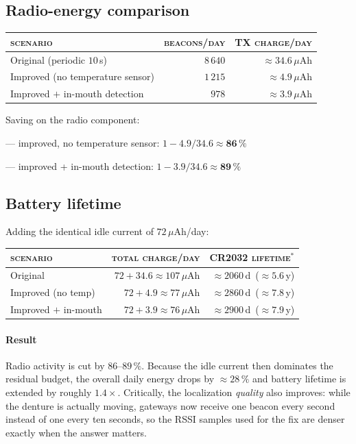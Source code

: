 \documentclass[11pt,a4paper]{article}
\begin{document}
\subsection*{Radio-energy comparison}

\begin{tabularx}{\linewidth}{@{} Y r r @{}}
\toprule
\textsc{scenario}                       & \textsc{beacons/day} & \textsc{TX charge/day} \\
\midrule
Original (periodic $10\,$s)             & $8\,640$ & $\approx 34.6\,\mu$Ah \\
Improved (no temperature sensor)        & $1\,215$ & $\approx 4.9\,\mu$Ah  \\
Improved $+$ in-mouth detection         & $978$    & $\approx 3.9\,\mu$Ah  \\
\bottomrule
\end{tabularx}

\smallskip
\noindent
Saving on the radio component:\par
\hspace*{1em}--- improved, no temperature sensor:\quad
$1 - 4.9/34.6 \approx \mathbf{86\,\%}$\par
\hspace*{1em}--- improved + in-mouth detection:\quad
$1 - 3.9/34.6 \approx \mathbf{89\,\%}$

\subsection*{Battery lifetime}

Adding the identical idle current of $72\,\mu$Ah/day:

\begin{tabularx}{\linewidth}{@{} Y r r @{}}
\toprule
\textsc{scenario}                       & \textsc{total charge/day} & \textsc{CR2032 lifetime}$^*$ \\
\midrule
Original                                & $72 + 34.6 \approx 107\,\mu$Ah  & $\approx 2060\,$d \,($\approx 5.6\,$y) \\
Improved (no temp)                      & $72 + 4.9 \approx 77\,\mu$Ah    & $\approx 2860\,$d \,($\approx 7.8\,$y) \\
Improved $+$ in-mouth                   & $72 + 3.9 \approx 76\,\mu$Ah    & $\approx 2900\,$d \,($\approx 7.9\,$y) \\
\bottomrule
\end{tabularx}

\smallskip

\paragraph{Result}
Radio activity is cut by $86$--$89\,\%$. Because the idle current then
dominates the residual budget, the overall daily energy drops by
$\approx 28\,\%$ and battery lifetime is extended by roughly
$\mathbf{1.4\times}$. Critically, the localization \emph{quality} also
improves: while the denture is actually moving, gateways now receive one
beacon every second instead of one every ten seconds, so the RSSI
samples used for the fix are denser exactly when the answer matters.
\end{document}
